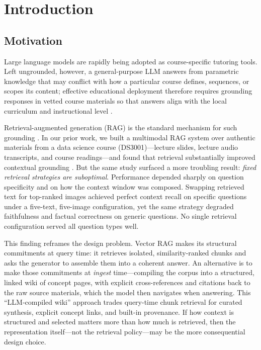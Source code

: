 \documentclass[letterpaper]{article} %
\begin{document}
\section{Introduction}

\subsection{Motivation}

Large language models are rapidly being adopted as course-specific tutoring tools. Left ungrounded, however, a general-purpose LLM answers from parametric knowledge that may conflict with how a particular course defines, sequences, or scopes its content; effective educational deployment therefore requires grounding responses in vetted course materials so that answers align with the local curriculum and instructional level \citep{li2025retrieval,jain2025aligning}.

Retrieval-augmented generation (RAG) is the standard mechanism for such grounding \citep{lewis2020retrieval}. In our prior work, we built a multimodal RAG system over authentic materials from a data science course (DS3001)---lecture slides, lecture audio transcripts, and course readings---and found that retrieval substantially improved contextual grounding \citep{wright2026multimodal}. But the same study surfaced a more troubling result: \emph{fixed retrieval strategies are suboptimal}. Performance depended sharply on question specificity and on how the context window was composed. Swapping retrieved text for top-ranked images achieved perfect context recall on specific questions under a five-text, five-image configuration, yet the same strategy degraded faithfulness and factual correctness on generic questions. No single retrieval configuration served all question types well.

This finding reframes the design problem. Vector RAG makes its structural commitments at query time: it retrieves isolated, similarity-ranked chunks and asks the generator to assemble them into a coherent answer. An alternative is to make those commitments at \emph{ingest} time---compiling the corpus into a structured, linked wiki of concept pages, with explicit cross-references and citations back to the raw source materials, which the model then navigates when answering. This ``LLM-compiled wiki'' approach trades query-time chunk retrieval for curated synthesis, explicit concept links, and built-in provenance. If how context is structured and selected matters more than how much is retrieved, then the representation itself---not the retrieval policy---may be the more consequential design choice.
\end{document}
